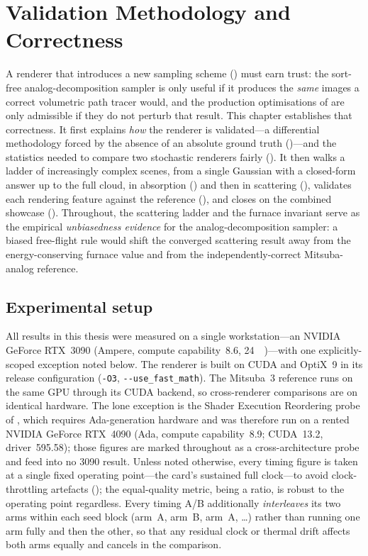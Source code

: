 \chapter{Validation Methodology and Correctness}
\label{ch:validation}

A renderer that introduces a new sampling scheme () must earn trust: the
sort-free analog-decomposition sampler is only useful if it produces the \emph{same} images a correct
volumetric path tracer would, and the production optimisations of  are only
admissible if they do not perturb that result. This chapter establishes that correctness. It first
explains \emph{how} the renderer is validated---a differential methodology forced by the absence of an
absolute ground truth ()---and the statistics needed to compare two
stochastic renderers fairly (). It then walks a ladder of increasingly
complex scenes, from a single Gaussian with a closed-form answer up to the full cloud, in absorption
() and then in scattering (), validates each
rendering feature against the reference (), and closes on the combined
showcase (). Throughout, the scattering ladder and the furnace
invariant serve as the empirical \emph{unbiasedness evidence} for the analog-decomposition sampler: a
biased free-flight rule would shift the converged scattering result away from the energy-conserving
furnace value and from the independently-correct Mitsuba-analog reference.

\section{Experimental setup}
\label{sec:setup}

All results in this thesis were measured on a single workstation---an NVIDIA GeForce RTX~3090 (Ampere,
compute capability~8.6, \SI{24}{\giga\byte})---with one explicitly-scoped exception noted below. The
renderer is built on CUDA and OptiX~9 in its release configuration (\texttt{-O3},
\texttt{-{}-use\_fast\_math}). The Mitsuba~3 reference runs on the same GPU through its CUDA backend, so
cross-renderer comparisons are on identical hardware. The lone exception is the Shader Execution
Reordering probe of , which requires Ada-generation hardware and was therefore run on a
rented NVIDIA GeForce RTX~4090 (Ada, compute capability~8.9; CUDA~13.2, driver~595.58); those figures are
marked throughout as a cross-architecture probe and feed into no 3090 result. Unless noted
otherwise, every timing figure is taken at a single fixed operating point---the card's sustained full
clock---to avoid clock-throttling artefacts (); the equal-quality metric,
being a ratio, is robust to the operating point regardless. Every timing A/B additionally
\emph{interleaves} its two arms within each seed block (arm~A, arm~B, arm~A, \ldots) rather than running
one arm fully and then the other, so that any residual clock or thermal drift affects both arms equally
and cancels in the comparison.


